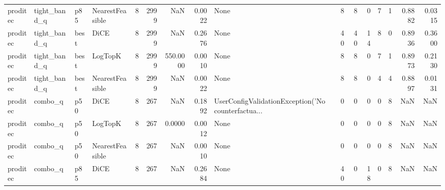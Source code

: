 \begin{tabular}{llllrrrrlrrrrrrr}
proditec &         tight\_band\_q &    p85 & NearestFeasible &            8 &                 2999 &                      NaN &      0.0022 &                                               None &      8 &            8 &        0 &              7 &          1 &             0.8882 &         0.0315 \\
proditec &         tight\_band\_q &   best &            DiCE &            8 &                 2999 &                      NaN &      0.2676 &                                               None &     40 &           40 &       14 &              8 &          0 &             0.8936 &         0.3600 \\
proditec &         tight\_band\_q &   best &         LogTopK &            8 &                 2999 &                 550.0000 &      0.0010 &                                               None &      8 &            8 &        0 &              7 &          1 &             0.8973 &         0.2130 \\
proditec &         tight\_band\_q &   best & NearestFeasible &            8 &                 2999 &                      NaN &      0.0022 &                                               None &      8 &            8 &        0 &              4 &          4 &             0.8897 &         0.0131 \\
proditec &              combo\_q &    p50 &            DiCE &            8 &                  267 &                      NaN &      0.1892 & UserConfigValidationException('No counterfactua... &      0 &            0 &        0 &              0 &          8 &                NaN &            NaN \\
proditec &              combo\_q &    p50 &         LogTopK &            8 &                  267 &                   0.0000 &      0.0012 &                                               None &      0 &            0 &        0 &              0 &          8 &                NaN &            NaN \\
proditec &              combo\_q &    p50 & NearestFeasible &            8 &                  267 &                      NaN &      0.0010 &                                               None &      0 &            0 &        0 &              0 &          8 &                NaN &            NaN \\
proditec &              combo\_q &    p85 &            DiCE &            8 &                  267 &                      NaN &      0.2684 &                                               None &     40 &            0 &       18 &              0 &          8 &                NaN &            NaN \\

\end{tabular}
